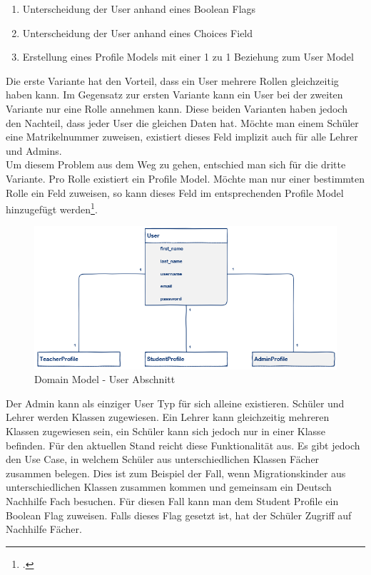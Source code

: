 \begin{enumerate}
	\item Unterscheidung der User anhand eines Boolean Flags
	\item Unterscheidung der User anhand eines Choices Field 
	\item Erstellung eines Profile Models mit einer 1 zu 1 Beziehung zum User Model
\end{enumerate}

Die erste Variante hat den Vorteil, dass ein User mehrere Rollen gleichzeitig haben kann. Im Gegensatz zur ersten Variante kann ein User bei der zweiten Variante nur eine Rolle annehmen kann. Diese beiden Varianten haben jedoch den Nachteil, dass jeder User die gleichen Daten hat. Möchte man einem Schüler eine Matrikelnummer zuweisen, existiert dieses Feld implizit auch für alle Lehrer und Admins. \\
Um diesem Problem aus dem Weg zu gehen, entschied man sich für die dritte Variante. Pro Rolle existiert ein Profile Model. Möchte man nur einer bestimmten Rolle ein Feld zuweisen, so kann dieses Feld im entsprechenden Profile Model hinzugefügt werden\footcite{django:user_types}. \\

\begin{figure}[H]
	\begin{center}
	\includegraphics[width=\textwidth, keepaspectratio]{images/domain_model_user.png}
	\caption{Domain Model - User Abschnitt}
	\label{fig:domain_model_user}
	\end{center}
\end{figure}

Der Admin kann als einziger User Typ für sich alleine existieren. Schüler und Lehrer werden Klassen zugewiesen. Ein Lehrer kann gleichzeitig mehreren Klassen zugewiesen sein, ein Schüler kann sich jedoch nur in einer Klasse befinden. Für den aktuellen Stand reicht diese Funktionalität aus. Es gibt jedoch den Use Case, in welchem Schüler aus unterschiedlichen Klassen Fächer zusammen belegen. Dies ist zum Beispiel der Fall, wenn Migrationskinder aus unterschiedlichen Klassen zusammen kommen und gemeinsam ein Deutsch Nachhilfe Fach besuchen. Für diesen Fall kann man dem Student Profile ein Boolean Flag zuweisen. Falls dieses Flag gesetzt ist, hat der Schüler Zugriff auf Nachhilfe Fächer. \\

